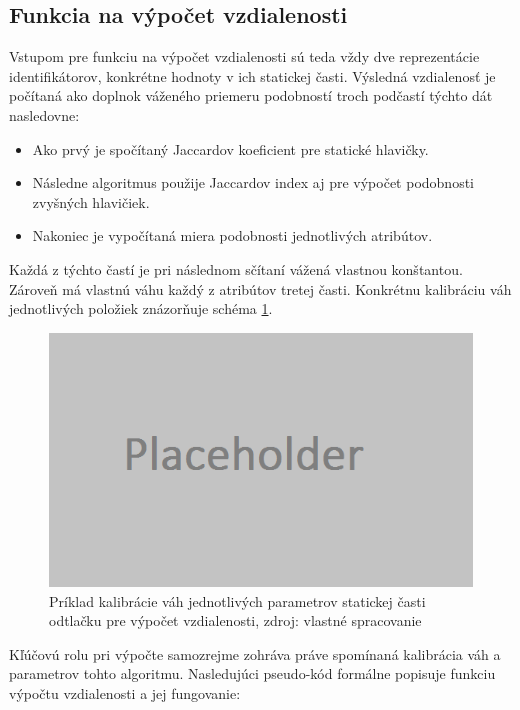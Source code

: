\documentclass[
  digital, %
  table,   %
  lof,     %
  nolot,   %
  nocover
]{fithesis3}
\begin{document}
\subsection{Funkcia na výpočet vzdialenosti}
\label{ss:distance-function}
Vstupom pre funkciu na výpočet vzdialenosti sú teda vždy dve reprezentácie
identifikátorov, konkrétne hodnoty v ich statickej časti. Výsledná vzdialenosť
je počítaná ako doplnok váženého priemeru podobností troch podčastí týchto dát
nasledovne:

\begin{itemize}
	\item Ako prvý je spočítaný Jaccardov koeficient pre statické hlavičky.
	\item Následne algoritmus použije Jaccardov index aj pre výpočet podobnosti
	zvyšných hlavičiek.
	\item Nakoniec je vypočítaná miera podobnosti jednotlivých atribútov. 
\end{itemize}

Každá z týchto častí je pri následnom sčítaní vážená vlastnou konštantou.
Zároveň má vlastnú váhu každý z atribútov tretej časti. Konkrétnu kalibráciu
váh jednotlivých položiek znázorňuje schéma \ref{fig:footprint-distance-cal}.

\begin{figure}[H]
  \centering
    \includegraphics[width=.99\textwidth]{images/footprint-distance-cal.png}
  \caption{Príklad kalibrácie váh jednotlivých parametrov statickej časti
  odtlačku pre výpočet vzdialenosti, zdroj: vlastné spracovanie}
  \label{fig:footprint-distance-cal}
\end{figure}

Kľúčovú rolu pri výpočte samozrejme zohráva práve spomínaná kalibrácia váh a parametrov tohto
algoritmu. Nasledujúci pseudo-kód formálne popisuje funkciu výpočtu vzdialenosti a jej fungovanie:
\end{document}
